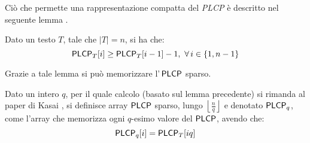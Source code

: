 Ciò che permette una rappresentazione compatta del \textit{PLCP} è descritto nel
seguente lemma \cite{plcp3}.
\begin{lemma}
  Dato un testo $T$, tale che $|T|=n$, si ha che:
  \begin{equation}
    \label{eq:plcpdef3}
    \mbox{\rm {\sf PLCP}}_T[i]\geq \mbox{\rm {\sf PLCP}}_T[i-1]-1,\,\,\forall\, i\in\{1,n-1\}
  \end{equation}
\end{lemma}
\noindent
Grazie a tale lemma si può memorizzare l'$\,\mbox{\rm {\sf PLCP}}$ sparso.
\begin{definizione}
  Dato un intero
  $q$, per il quale calcolo (basato sul lemma precedente) si rimanda al paper di
  Kasai \cite{plcp3}, si definisce array $\mbox{\rm {\sf PLCP}}$ sparso, lungo
  $\left\lfloor\frac{n}{q}\right\rfloor$ e denotato $\mbox{\rm {\sf PLCP}}_q$, come l'array che
  memorizza ogni $q$-esimo valore del $\mbox{\rm {\sf PLCP}}$, avendo che:
  \begin{equation}
    \label{eq:plcpdef4}
    \mbox{\rm {\sf PLCP}}_q[i]=\mbox{\rm {\sf PLCP}}_T[iq]
  \end{equation}
\end{definizione}
